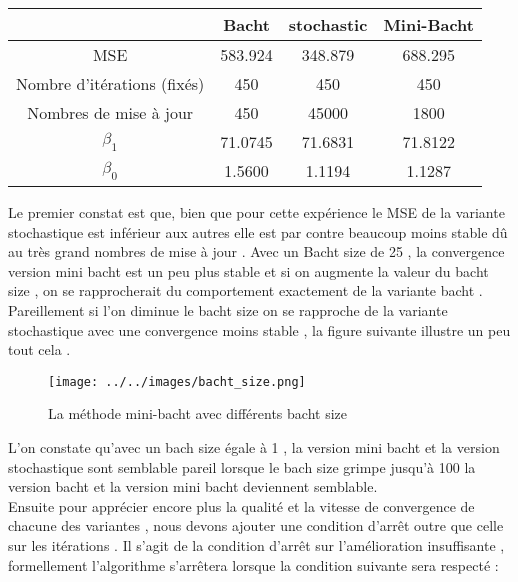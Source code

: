 \documentclass[12pt,a4paper]{article}
\begin{document}
\begin{center}
\begin{tabular}{|c|c|c|c|}
\hline
   & Bacht & stochastic & Mini-Bacht \\ \hline

MSE  & 583.924 & 348.879 & 688.295
	

\\ \hline

Nombre d'itérations (fixés)   & 450 & 450 & 450
	

\\ \hline

Nombres de mise à jour  & 450 & 45000 & 1800
	

\\ \hline


$\beta_{1}$  & 71.0745 & 71.6831 & 71.8122
	

\\ \hline


$\beta_{0}$  & 1.5600 & 1.1194 & 1.1287
	

\\ \hline
	
\end{tabular}
\end{center}

\vspace{0.2in}

Le premier constat est que, bien que pour cette expérience le MSE de  la variante stochastique est inférieur aux autres elle est par contre beaucoup moins stable dû au très grand nombres de mise à jour . Avec un Bacht size de 25 , la convergence version mini bacht est un peu plus stable et si on augmente la valeur du bacht size  , on se rapprocherait du comportement exactement de la variante bacht . Pareillement si l'on diminue le bacht size on se rapproche de la variante stochastique avec une convergence moins stable , la figure suivante illustre un peu tout cela . 


\newpage
\begin{figure}[here]
\begin{center}
\texttt{[image: ../../images/bacht\_size.png]}
\end{center}
\caption{La méthode mini-bacht avec différents bacht size}
\end{figure}
\vspace{0.2in} 

L'on constate qu'avec un bach size égale à 1 , la version mini bacht et la version stochastique sont semblable pareil lorsque le bach size grimpe jusqu'à 100  la version bacht et la version mini bacht deviennent semblable.\\

Ensuite pour apprécier encore plus la qualité et la vitesse de convergence de chacune des variantes , nous devons ajouter une condition d'arrêt outre que celle sur les itérations . Il s'agit de la condition d'arrêt sur l'amélioration insuffisante , formellement l'algorithme s'arrêtera lorsque la condition suivante sera respecté :  



\newpage

\end{document}
